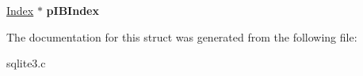 \begin{DoxyCompactItemize}
\begin{tabbing}
\end{tabbing}\item 
\hyperlink{structIndex}{Index} $\ast$ {\bfseries p\+I\+B\+Index}\hypertarget{structSrcList_1_1SrcList__item_a33f82c4d70c773856d55a5ebe9b1cc8c}{}\label{structSrcList_1_1SrcList__item_a33f82c4d70c773856d55a5ebe9b1cc8c}

\end{DoxyCompactItemize}


The documentation for this struct was generated from the following file\+:\begin{DoxyCompactItemize}
\item 
sqlite3.\+c\end{DoxyCompactItemize}
